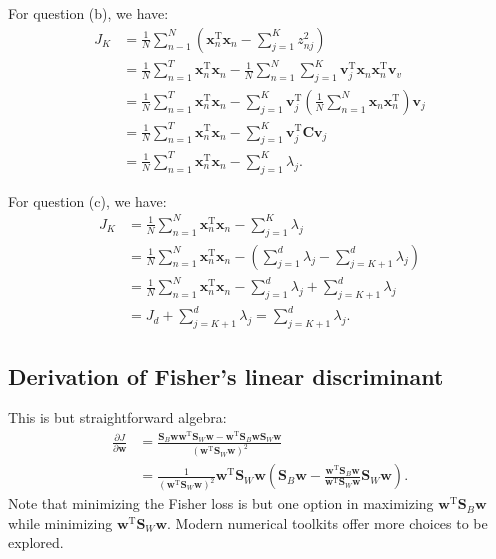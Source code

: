 \documentclass[UTF8]{ctexart}
\begin{document}
For question (b), we have:
$$
\begin{aligned}
J_{K}&=\frac{1}{N}\sum_{n-1}^{N}\left(\textbf{x}_{n}^{\text{T}}\textbf{x}_{n}-\sum_{j=1}^{K}z_{nj}^{2} \right)\\
&=\frac{1}{N}\sum_{n=1}^{T}\textbf{x}_{n}^{\text{T}}\textbf{x}_{n}-\frac{1}{N}\sum_{n=1}^{N}\sum_{j=1}^{K}\textbf{v}^{\text{T}}_{j}\textbf{x}_{n}\textbf{x}_{n}^{\text{T}}\textbf{v}_{v}\\
&=\frac{1}{N}\sum_{n=1}^{T}\textbf{x}_{n}^{\text{T}}\textbf{x}_{n}-\sum_{j=1}^{K}\textbf{v}_{j}^{\text{T}}\left(\frac{1}{N}\sum_{n=1}^{N}\textbf{x}_{n}\textbf{x}_{n}^{\text{T}} \right)\textbf{v}_{j}\\
&=\frac{1}{N}\sum_{n=1}^{T}\textbf{x}_{n}^{\text{T}}\textbf{x}_{n}-\sum_{j=1}^{K}\textbf{v}_{j}^{\text{T}}\textbf{C}\textbf{v}_{j}\\
&=\frac{1}{N}\sum_{n=1}^{T}\textbf{x}_{n}^{\text{T}}\textbf{x}_{n}-\sum_{j=1}^{K}\lambda_{j}.
\end{aligned}
$$

For question (c), we have:
$$
\begin{aligned}
J_{K}&=\frac{1}{N}\sum_{n=1}^{N}\textbf{x}_{n}^{\text{T}}\textbf{x}_{n}-\sum_{j=1}^{K}\lambda_{j}\\
&=\frac{1}{N}\sum_{n=1}^{N}\textbf{x}_{n}^{\text{T}}\textbf{x}_{n}-\left(\sum_{j=1}^{d}\lambda_{j}-\sum_{j=K+1}^{d}\lambda_{j} \right)\\
&=\frac{1}{N}\sum_{n=1}^{N}\textbf{x}_{n}^{\text{T}}\textbf{x}_{n}-\sum_{j=1}^{d}\lambda_{j}+\sum_{j=K+1}^{d}\lambda_{j}\\
&=J_{d}+\sum_{j=K+1}^{d}\lambda_{j}=\sum_{j=K+1}^{d}\lambda_{j}.
\end{aligned}
$$

\subsection{Derivation of Fisher's linear discriminant}
This is but straightforward algebra:
$$
\begin{aligned}
\frac{\partial J}{\partial \textbf{w}}&= \frac{\textbf{S}_{B}\textbf{w}\textbf{w}^{\text{T}}\textbf{S}_{W}\textbf{w}-\textbf{w}^{\text{T}}\textbf{S}_{B}\textbf{w}\textbf{S}_{W}\textbf{w}}{\left(\textbf{w}^{\text{T}}\textbf{S}_{W}\textbf{w}\right)^{2}}\\
&=\frac{1}{\left(\textbf{w}^{\text{T}}\textbf{S}_{W}\textbf{w}\right)^{2}}\textbf{w}^{\text{T}}\textbf{S}_{W}\textbf{w}\left(\textbf{S}_{B}\textbf{w}-\frac{\textbf{w}^{\text{T}}\textbf{S}_{B}\textbf{w}}{\textbf{w}^{\text{T}}\textbf{S}_{W}\textbf{w}}\textbf{S}_{W}\textbf{w} \right).
\end{aligned}
$$
Note that minimizing the Fisher loss is but one option in maximizing $\textbf{w}^{\text{T}}\textbf{S}_{B}\textbf{w}$ while minimizing $\textbf{w}^{\text{T}}\textbf{S}_{W}\textbf{w}$.
Modern numerical toolkits offer more choices to be explored.
\end{document}
